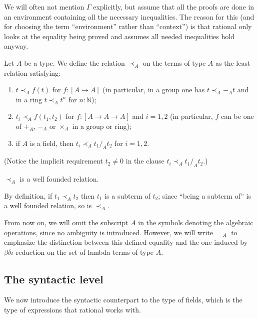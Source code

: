 \documentclass[numreferences]{kluwer}
\newcommand{\tacticname}[1]{\textsf{#1}}
\newcommand{\rational}{\tacticname{rational}}
\newcommand{\less}{\mathrel{\prec_A}}
\newcommand{\nat}{{\mathbb N}}
\begin{document}
\begin{article}
We will often not mention $\Gamma$ explicitly, but assume that all the
proofs are done in an environment containing all the necessary inequalities.
The reason for this (and for choosing the term ``environment'' rather than
``context'') is that {\rational} only looks at the equality being proved
and assumes all needed inequalities hold anyway.

\begin{definition}\label{defn:less} Let $A$ be a type.  We define the relation
$\less$ on the terms of type $A$ as the least relation satisfying:
\begin{enumerate}
\item $t\less f(t)$ for $f:[A\to A]$ (in particular, in a group one has
$t\less -_A t$ and in a ring $t\less t^n$ for $n:\nat$);
\item $t_i\less f(t_1,t_2)$ for $f:[A\to A\to A]$ and $i=1,2$ (in
particular, $f$ can be one of $+_A$, $-_A$ or $\times_A$ in a group or
ring);
\item if $A$ is a field, then $t_i\less t_1/_A t_2$ for $i=1,2$.
\end{enumerate}
(Notice the implicit requirement $t_2\neq 0$ in the clause
$t_i\less t_1/_A t_2$.)
\end{definition}

\begin{proposition}\label{lesswff}
$\less$ is a well founded relation.
\end{proposition}
\begin{pf}
By definition, if $t_1\less t_2$ then $t_1$ is a subterm of $t_2$; since
``being a subterm of'' is a well founded relation, so is $\less$.
\end{pf}

\begin{notation} From now on, we will omit the subscript $A$ in the
symbols denoting the algebraic operations, since no ambiguity is introduced.
However, we will write $=_A$ to emphasize the distinction between this
defined equality and the one induced by $\beta\delta\iota$-reduction on
the set of lambda terms of type $A$.
\end{notation}

\subsection{The syntactic level}\label{expressions}

We now introduce the syntactic counterpart to the type of fields, which
is the type of expressions that {\rational} works with.


\end{article}
\end{document}

